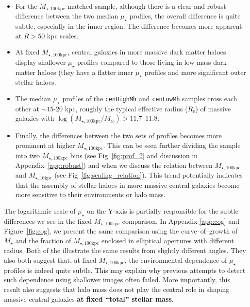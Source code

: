 \documentclass[a4paper,fleqn,usenatbib]{mnras}
\def\rbcg{\texttt{cenHighMh}}
\def\nbcg{\texttt{cenLowMh}}
\def\mstar{{$M_{\star}$}}
\def\minn{{$M_{\star,10\mathrm{kpc}}$}}
\def\mtot{{$M_{\star,100\mathrm{kpc}}$}}
\def\logmtot{{$\log (M_{\star,100\mathrm{kpc}}/M_{\odot})$}}
\def\mden{{$\mu_{\star}$}}
\begin{document}
    \begin{itemize}
        
        \item For the \mtot{} matched sample, although there is a clear and robust 
            difference between the two median \mden{} profiles, the overall difference 
            is quite subtle, especially in the inner region. 
            The difference becomes more apparent at $R>50$ kpc scales.  
            
        \item At fixed \mtot{}, central galaxies in more massive dark matter haloes 
            display shallower \mden{} profiles compared to those living in low mass 
            dark matter haloes (they have a flatter inner \mden{} profiles and 
            more significant outer stellar haloes. 
            
        \item The median \mden{} profiles of the \rbcg{} and \nbcg{} samples cross 
            each other at ${\sim} 15$-20 kpc, roughly the typical effective radius 
            ($R_{\mathrm{e}}$) of massive galaxies with \logmtot{}$>11.7$--11.8.      
            
        \item Finally, the differences between the two sets of profiles becomes 
            more prominent at higher \mtot{}. 
            This can be seen further dividing the sample into two \mtot{} bins 
            (see Fig~\ref{fig:prof_2} and discussion in Appendix~\ref{app:robust}) 
            and when we discuss the relation between \mtot{} and 
            \minn{} (see Fig~\ref{fig:scaling_relation}). 
            This trend potentially indicates that the assembly of stellar haloes in 
            more massive central galaxies become more sensitive to their 
            environments or halo mass. 
            
    \end{itemize}

    The logarithmic scale of \mden{} on the Y-axis is partially responsible for the 
    subtle differences we see in the fixed \mtot{} comparison.  
    In Appendix \ref{app:cog} and Figure~\ref{fig:cog}, we present the same 
    comparison using the curve--of--growth of \mstar{} and the fraction of \mtot{} 
    enclosed in elliptical apertures with different radius. 
    Both of the illustrate the same results from slightly different angles. 
    They also both suggest that, at fixed \mtot{}, the environmental dependence of 
    \mden{} profiles is indeed quite subtle. 
    This may explain why previous attempts to detect such dependence using shallower 
    images often failed. 
    More importantly, this result also suggests that halo mass does not play the 
    central role in shaping massive central galaxies \textbf{at fixed ``total'' 
    stellar mass}.
    
\end{document}
